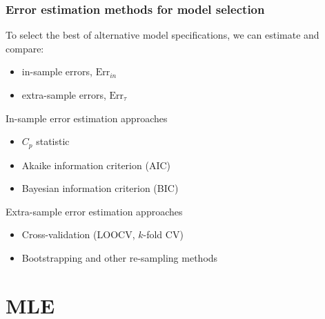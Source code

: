 \documentclass[smaller]{beamer}
\newcommand{\?}{\stackrel{?}{=}}
\newcommand{\Err}{\text{Err}}
\begin{document}
  \begin{frame}
   \frametitle{Error estimation methods for model selection}
   \pause
   To select the best of alternative model specifications, we can estimate and compare: \pause
   \begin{itemize}
   \item in-sample errors, $\text{Err}_{in}$ 
   \item extra-sample errors, $\Err_{\tau}$
   \end{itemize}

   \begin{block}{In-sample error estimation approaches} \pause
     \begin{itemize}[<+->]
   \item $C_p$ statistic
   \item Akaike information criterion (AIC)
   \item Bayesian information criterion (BIC)
   \end{itemize}
 \end{block}
 \pause
 
   \begin{block}{Extra-sample error estimation approaches} \pause
   \begin{itemize}[<+->]
   \item Cross-validation (LOOCV, $k$-fold CV)
   \item Bootstrapping and other re-sampling methods  
   \end{itemize}
 \end{block}

   
 \end{frame}

 

\section{MLE}
\end{document}
